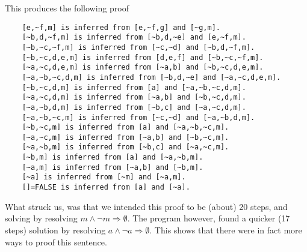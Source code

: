 \documentclass{report}
\begin{document}
\begin{itemize}
\begin{verbatim}
    \end{verbatim}
    This produces the following proof
    \begin{verbatim}
    [e,~f,m] is inferred from [e,~f,g] and [~g,m].
    [~b,d,~f,m] is inferred from [~b,d,~e] and [e,~f,m].
    [~b,~c,~f,m] is inferred from [~c,~d] and [~b,d,~f,m].
    [~b,~c,d,e,m] is inferred from [d,e,f] and [~b,~c,~f,m].
    [~a,~c,d,e,m] is inferred from [~a,b] and [~b,~c,d,e,m].
    [~a,~b,~c,d,m] is inferred from [~b,d,~e] and [~a,~c,d,e,m].
    [~b,~c,d,m] is inferred from [a] and [~a,~b,~c,d,m].
    [~a,~c,d,m] is inferred from [~a,b] and [~b,~c,d,m].
    [~a,~b,d,m] is inferred from [~b,c] and [~a,~c,d,m].
    [~a,~b,~c,m] is inferred from [~c,~d] and [~a,~b,d,m].
    [~b,~c,m] is inferred from [a] and [~a,~b,~c,m].
    [~a,~c,m] is inferred from [~a,b] and [~b,~c,m].
    [~a,~b,m] is inferred from [~b,c] and [~a,~c,m].
    [~b,m] is inferred from [a] and [~a,~b,m].
    [~a,m] is inferred from [~a,b] and [~b,m].
    [~a] is inferred from [~m] and [~a,m].
    []=FALSE is inferred from [a] and [~a].
    \end{verbatim}
    What struck us, was that we intended this proof to be (about) 20 steps, and solving by resolving $m \land \neg m \Rightarrow \emptyset$. The program however, found a quicker (17 steps) solution by resolving $a \land \neg a \Rightarrow \emptyset$. This shows that there were in fact more ways to proof this sentence.
\end{itemize}
\end{document}
